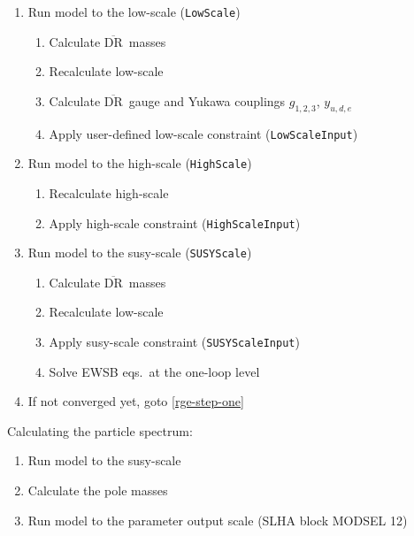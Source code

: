 \documentclass[final,3p,times,pdflatex]{elsarticle}
\newcommand{\code}[1]{\lstinline|#1|}  %
\newcommand{\textoverline}[1]{$\overline{\mbox{#1}}$}
\newcommand{\DRbar}{\textoverline{DR}\xspace}
\begin{document}
\begin{enumerate}
\item \label{rge-step-one} Run model to the low-scale (\code{LowScale})
  \begin{enumerate}
  \item Calculate \DRbar\ masses
  \item Recalculate low-scale
  \item Calculate \DRbar\ gauge and Yukawa couplings $g_{1,2,3}$, $y_{u,d,e}$
  \item Apply user-defined low-scale constraint (\code{LowScaleInput})
  \end{enumerate}
\item Run model to the high-scale (\code{HighScale})
  \begin{enumerate}
  \item Recalculate high-scale
  \item Apply high-scale constraint (\code{HighScaleInput})
  \end{enumerate}
\item Run model to the susy-scale (\code{SUSYScale})
  \begin{enumerate}
  \item Calculate \DRbar\ masses
  \item Recalculate low-scale
  \item Apply susy-scale constraint (\code{SUSYScaleInput})
  \item Solve EWSB eqs.\ at the one-loop level
  \end{enumerate}
\item If not converged yet, goto \ref{rge-step-one}
\end{enumerate}
%
Calculating the particle spectrum:
\begin{enumerate}
\item Run model to the susy-scale
\item Calculate the pole masses
\item Run model to the parameter output scale (SLHA block MODSEL 12)
\end{enumerate}
%
\end{document}
